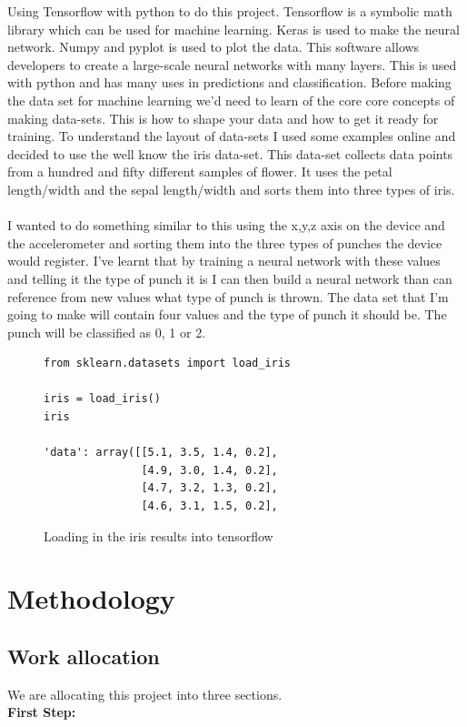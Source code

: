 \documentclass[a4paper,12pt]{report}
\begin{document}
Using Tensorflow with python to do this project. Tensorflow is a symbolic math library which can be used for machine learning. Keras is used to make the neural network. Numpy and pyplot is used to plot the data. This software allows developers to create a large-scale neural networks with many layers. This is used with python and has many uses in predictions and classification. Before making the data set for machine learning we'd need to learn of the core core concepts of making data-sets. This is how to shape your data and how to get it ready for training. To understand the layout of data-sets I used some examples online and decided to use the well know the iris data-set. This data-set collects data points from a hundred and fifty different samples of flower. It uses the petal length/width and the sepal length/width and sorts them into three types of iris.
\\
\\
I wanted to do something similar to this using the x,y,z axis on the device and the accelerometer and sorting them into the three types of punches the device would register. I've learnt that by training a neural network with these values and telling it the type of punch it is I can then build a neural network than can reference from new values what type of punch is thrown. The data set that I'm going to make will contain four values and the type of punch it should be. The punch will be classified as 0, 1 or 2.

\begin{figure}[h]
\begin{verbatim}
from sklearn.datasets import load_iris

iris = load_iris()
iris

'data': array([[5.1, 3.5, 1.4, 0.2],
               [4.9, 3.0, 1.4, 0.2],
               [4.7, 3.2, 1.3, 0.2],
               [4.6, 3.1, 1.5, 0.2],
\end{verbatim}
\caption{Loading in the iris results into tensorflow}
\label{fig:iris}
\end{figure}

\chapter{Methodology}
\section{Work allocation}
We are allocating this project into three sections.\\
\textbf{First Step:}
\end{document}
